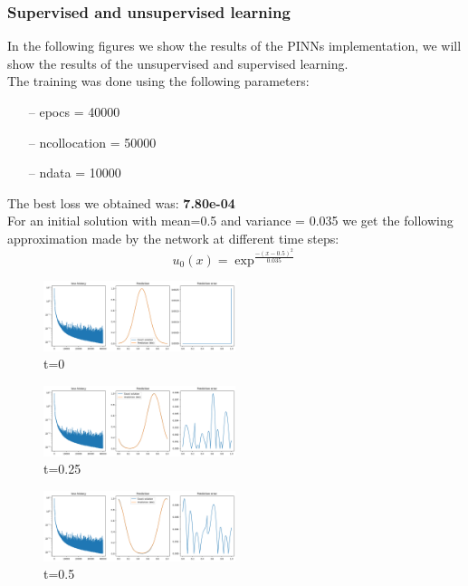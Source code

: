 \documentclass{article}
\begin{document}
\subsubsection{Supervised and unsupervised learning}
In the following figures we show the results of the PINNs implementation, we will show the results of the unsupervised and supervised learning.\\

The training was done using the following parameters:
\begin{itemize}
   \item[--] epocs = 40000
   \item[--] ncollocation = 50000
   \item[--] ndata = 10000
\end{itemize} The best loss we obtained was: \textbf{7.80e-04} \\
For an initial solution with mean=0.5 and variance = 0.035 we get the following approximation made by the network at different time steps:\\

\begin{equation*}
    u_0(x) = \exp^{\frac{-(x-0.5)^2}{0.035}}
\end{equation*}

\begin{figure}[!h]
    \centering
    \includegraphics[width=0.5\textwidth]{images/r1.png}
    \caption{t=0}
\end{figure}
\begin{figure}[!h]
    \centering
    \includegraphics[width=0.5\textwidth]{images/r2.png}
    \caption{t=0.25}
\end{figure}
\begin{figure}[!h]
    \centering
    \includegraphics[width=0.5\textwidth]{images/r3.png}
    \caption{t=0.5}
\end{figure}
\end{document}
